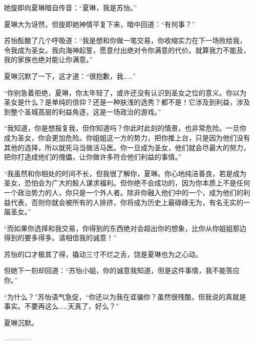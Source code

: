 \begin{this_body}
她旋即向夏琳暗自传音：“夏琳，我是苏怡。”

夏琳大为讶然，但旋即她神情平复下来，暗中回道：“有何事？”

苏怡酝酿了几个呼吸道：“我是想和你做一笔交易，你收缩实力在下一场败给我，令我成为圣女。我向海神起誓，愿意付出绝对令你满意的代价。就算我力不能及，我的家族也绝对能让你满意。”

夏琳沉默了一下，这才道：“很抱歉，我……”

“你别急着拒绝，夏琳，你太年轻了，或许还没有认识到圣女之位的意义。你以为圣女是什么？是单纯的信仰？还是一种肤浅的选秀？都不是！它涉及到利益，涉及到整个圣城高层的利益角逐，这是一场政治的游戏。”

“我知道，你是想报复我，但你知道吗？你此时此刻的情景，也非常危险。一旦你成为圣女，你会更加危险。你姐姐这一方的势力，把你推上台，只是因为他们没有其他的选择，所以就死马当做活马医。你一旦成为圣女，他们就会尽最大的努力，把你打造成他们的傀儡，让你做许多符合他们利益的事情。”

“我虽然和你相处的时间不长，但我很了解你，夏琳。你心地纯洁善良，若是成为圣女，恐怕会为广大的鲛人谋求福利。但你绝不会成功的，因为你本质上不是任何一个政治势力的人，你只是一个外人者。除非你融入他们中的一个，成为他们的利益代表，否则你就会被所有的人排挤，你将成为历史上最碌碌无为，有名无实的一届圣女。”

“而如果你选择和我交易，你得到的东西绝对会超出你的想象，比你从你姐姐那边得到的要多得多。请相信我的诚意！”

苏怡的口才极其了得，撬动三寸不烂之舌，饶是夏琳也为之心动。

但她下一刻却回道：“苏怡小姐，你的诚意我知道，但是这件事情，我不能答应你。”

“为什么？”苏怡语气急促，“你还以为我在诓骗你？虽然很残酷，但我说的真就是事实。不要再这么……天真了，好么？”

夏琳沉默。

------------

\end{this_body}

